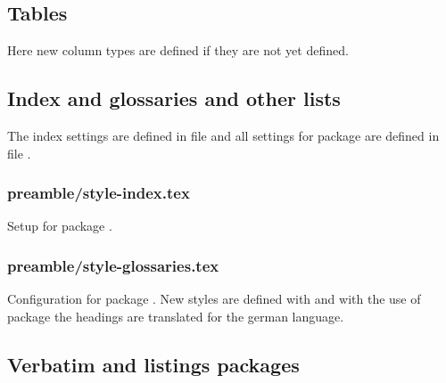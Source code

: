 \subsection{Tables}
\label{sec:style:tables}

Here new column types are defined if they are not yet defined.


\subsection{Index and glossaries and other lists}
\label{sec:style:index}

The index settings are defined in file  and all settings for package  are defined in file .


\subsubsection{preamble/style-index.tex}

Setup for package .


\subsubsection{preamble/style-glossaries.tex}

Configuration for package . New styles are defined with  and with the use of package  the headings are translated for the german language.


\subsection{Verbatim and listings packages}
\label{sec:style:listings}

